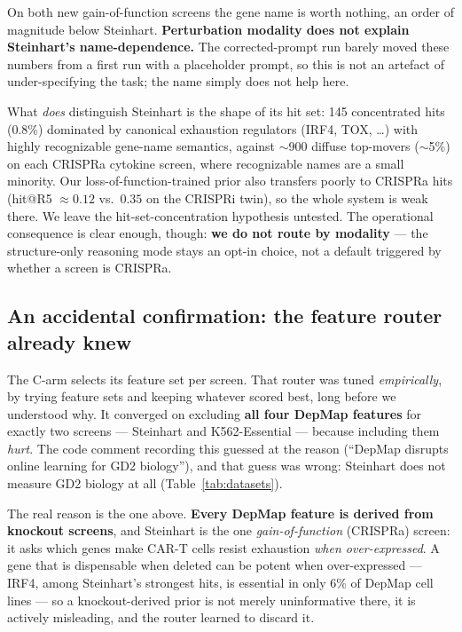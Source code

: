 \documentclass[11pt]{article}
\begin{document}
\noindent
On both new gain-of-function screens the gene name is worth nothing, an order of magnitude below
Steinhart. \textbf{Perturbation modality does not explain Steinhart's name-dependence.} The
corrected-prompt run barely moved these numbers from a first run with a placeholder prompt, so this is
not an artefact of under-specifying the task; the name simply does not help here.

What \emph{does} distinguish Steinhart is the shape of its hit set: 145 concentrated hits (0.8\%)
dominated by canonical exhaustion regulators (IRF4, TOX, \ldots) with highly recognizable gene-name
semantics, against $\sim$900 diffuse top-movers ($\sim$5\%) on each CRISPRa cytokine screen, where
recognizable names are a small minority. Our loss-of-function-trained prior also transfers poorly to CRISPRa hits
(hit@R5 $\approx 0.12$ vs.\ $0.35$ on the CRISPRi twin), so the whole system is weak there. We leave the
hit-set-concentration hypothesis untested. The operational consequence is clear enough, though:
\textbf{we do not route by modality} --- the structure-only reasoning mode stays an opt-in choice, not
a default triggered by whether a screen is CRISPRa.

\subsection*{An accidental confirmation: the feature router already knew}

The C-arm selects its feature set per screen. That router was tuned \emph{empirically}, by trying
feature sets and keeping whatever scored best, long before we understood why. It converged on
excluding \textbf{all four DepMap features} for exactly two screens --- Steinhart and K562-Essential
--- because including them \emph{hurt}. The code comment recording this guessed at the reason
(``DepMap disrupts online learning for GD2 biology''), and that guess was wrong: Steinhart does not
measure GD2 biology at all (Table~\ref{tab:datasets}).

The real reason is the one above. \textbf{Every DepMap feature is derived from knockout screens},
and Steinhart is the one \emph{gain-of-function} (CRISPRa) screen: it asks which genes make CAR-T
cells resist exhaustion \emph{when over-expressed}. A gene that is dispensable when deleted can be
potent when over-expressed --- IRF4, among Steinhart's strongest hits, is essential in only 6\% of
DepMap cell lines --- so a knockout-derived prior is not merely uninformative there, it is actively
misleading, and the router learned to discard it.
\end{document}
